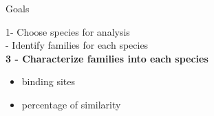 \documentclass[11pt]{beamer}
\begin{document}
\begin{frame}{Goals}

	1- Choose species for analysis \\  - Identify families for each species \\ \medbreak
	\textbf{3 - Characterize families into each species}
		\begin{itemize}
			\item binding sites 
			\item percentage of similarity			 
		\end{itemize}
\end{frame}

\end{document}
